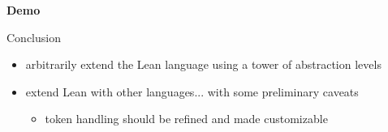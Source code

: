 \documentclass[t]{beamer}
\begin{document}
\begin{frame}
  \vfill
  \begin{center}
    \Huge\textbf{Demo}
  \end{center}
  \vfill
\end{frame}

\begin{frame}{Conclusion}
  \begin{itemize}
  \item arbitrarily extend the Lean language using a tower of abstraction levels
    \bigskip
  \item extend Lean with other languages... with some preliminary caveats
    \begin{itemize}
    \item token handling should be refined and made customizable
    \end{itemize}
  \end{itemize}
\end{frame}
\end{document}
